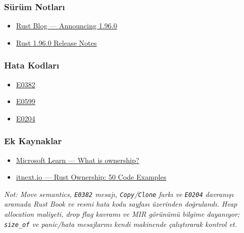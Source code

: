 \documentclass[12pt,a4paper]{article}
\begin{document}
\subsubsection{Sürüm Notları}\label{sürüm-notları-10}

\begin{itemize}
\tightlist
\item
  \href{https://blog.rust-lang.org/2026/05/28/Rust-1.96.0/}{Rust Blog --- Announcing 1.96.0}
\item
  \href{https://doc.rust-lang.org/stable/releases.html\#version-1960-2026-05-28}{Rust 1.96.0 Release Notes}
\end{itemize}

\subsubsection{Hata Kodları}\label{hata-kodları-10}

\begin{itemize}
\tightlist
\item
  \href{https://doc.rust-lang.org/error_codes/E0382.html}{E0382}
\item
  \href{https://doc.rust-lang.org/error_codes/E0599.html}{E0599}
\item
  \href{https://doc.rust-lang.org/error_codes/E0204.html}{E0204}
\end{itemize}

\subsubsection{Ek Kaynaklar}\label{ek-kaynaklar-10}

\begin{itemize}
\tightlist
\item
  \href{https://learn.microsoft.com/en-gb/training/modules/rust-memory-management/1-what-is-ownership}{Microsoft Learn --- What is ownership?}
\item
  \href{https://itnext.io/rust-ownership-50-code-examples-96203fcf79ea}{itnext.io --- Rust Ownership: 50 Code Examples}
\end{itemize}

\emph{Not: Move semantics, \texttt{E0382} mesajı, \texttt{Copy}/\texttt{Clone} farkı ve \texttt{E0204} davranışı aramada Rust Book ve resmi hata kodu sayfası üzerinden doğrulandı. Heap allocation maliyeti, drop flag kavramı ve MIR görünümü bilgime dayanıyor; \texttt{size\_of} ve panic/hata mesajlarını kendi makinende çalıştırarak kontrol et.}
\end{document}
